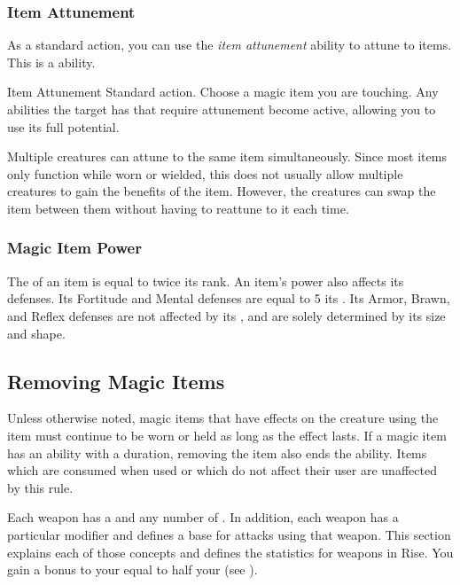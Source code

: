     \subsubsection{Item Attunement}\label{Item Attunement}

      As a standard action, you can use the \textit{item attunement} ability to attune to items.
      This is a \magical ability.

      \begin{attuneability}{Item Attunement}{}
        \abilityusagetime Standard action.
        \rankline
        Choose a magic item you are touching.
        Any abilities the target has that require attunement become active, allowing you to use its full potential.
      \end{attuneability}

       Multiple creatures can attune to the same item simultaneously.
      Since most items only function while worn or wielded, this does not usually allow multiple creatures to gain the benefits of the item.
      However, the creatures can swap the item between them without having to reattune to it each time.

    \subsubsection{Magic Item Power}\label{Magic Item Power}
      The  of an item is equal to twice its rank.
      An item's power also affects its defenses.
      Its Fortitude and Mental defenses are equal to 5 \add its .
      Its Armor, Brawn, and Reflex defenses are not affected by its , and are solely determined by its size and shape.

  \subsection{Removing Magic Items}
    Unless otherwise noted, magic items that have effects on the creature using the item must continue to be worn or held as long as the effect lasts.
    If a magic item has an ability with a duration, removing the item also ends the ability.
    Items which are consumed when used or which do not affect their user are unaffected by this rule.

\newpage
{}

  Each weapon has a  and any number of .
  In addition, each weapon has a particular  modifier and defines a base  for attacks using that weapon.
  This section explains each of those concepts and defines the statistics for weapons in Rise.
  You gain a bonus to your  equal to half your  (see ).

